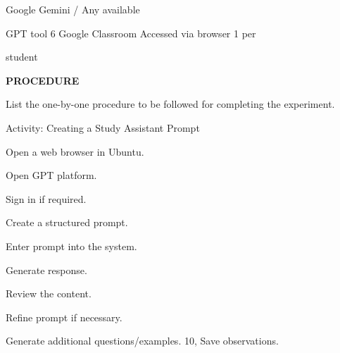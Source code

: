 \documentclass[10pt,a4paper]{article}
\begin{document}
\noindent Google Gemini / Any available\par

\noindent GPT tool 6                                              Google Classroom Accessed via browser 1 per\par
\noindent student\par

\medskip\noindent\textbf{PROCEDURE}\par
\noindent List the one-by-one procedure to be followed for completing the experiment.\par
\noindent Activity: Creating a Study Assistant Prompt\par
\noindent Open a web browser in Ubuntu.\par
\noindent Open GPT platform.\par
\clearpage
\noindent Sign in if required.\par
\noindent Create a structured prompt.\par
\noindent Enter prompt into the system.\par
\noindent Generate response.\par
\noindent Review the content.\par
\noindent Refine prompt if necessary.\par
\noindent Generate additional questions/examples. 10, Save observations.\par
\end{document}
